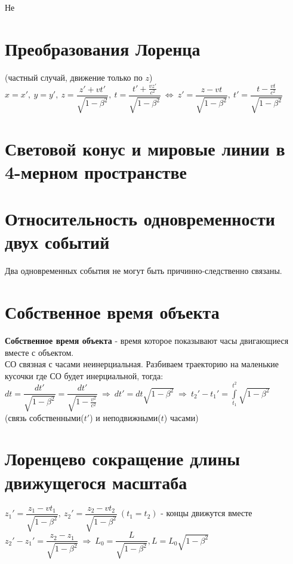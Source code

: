 \begin{multicols*}{2}
		Не
		
		\section{Преобразования Лоренца}
		
		(частный случай, движение только по $ z $) \\ 
		$ x=x',~ y=y',~ z=\dfrac{z'+vt'}{\sqrt{1-\beta^2}},~ t=\dfrac{t'+\frac{vz'}{c^2}}{\sqrt{1-\beta^2}}~\Leftrightarrow~ z'=\dfrac{z-vt}{\sqrt{1-\beta^2}},~ t'=\dfrac{t-\frac{vt}{c^2}}{\sqrt{1-\beta^2}} $
		
		\section{Световой конус и мировые линии в 4-мерном пространстве}
		
		\section{Относительность одновременности двух событий}
		
		Два одновременных события не могут быть причинно-следственно связаны.
		
		\section{Собственное время объекта}
		
		\textbf{Собственное время объекта} - время которое показывают часы двигающиеся вместе с объектом. \\
		СО  связная с часами неинерциальная. Разбиваем траекторию на маленькие кусочки где СО будет инерциальной, тогда: \\
		$ dt=\dfrac{dt'}{\sqrt{1-\beta^2}} = \dfrac{dt'}{\sqrt{1-\frac{v^2}{c^2}}} ~\Rightarrow~ dt'=dt\sqrt{1-\beta^2} ~\Rightarrow~ t_2'-t_1' = \int\limits_{t_1}^{t^2}\sqrt{1-\beta^2} $ \\
		(связь собственными($ t' $) и неподвижными($ t  $) часами)
		
		\section{Лоренцево сокращение длины движущегося масштаба}
		
		$ z_1'= \dfrac{z_1-vt_1}{\sqrt{1-\beta^2}},~ z_2'= \dfrac{z_2-vt_2}{\sqrt{1-\beta^2}} ~ (t_1=t_2)$ - концы движутся вместе \\
		$ z_2'-z_1' = \dfrac{z_2-z_1}{\sqrt{1-\beta^2}} ~ \Rightarrow ~ L_0 = \dfrac{L}{\sqrt{1-\beta^2}}, L = L_0\sqrt{1-\beta^2} $
		

\end{multicols*}
